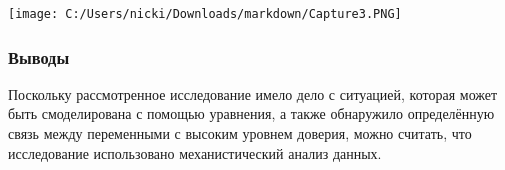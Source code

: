 \documentclass[
]{article}
\begin{document}
\texttt{[image: C:/Users/nicki/Downloads/markdown/Capture3.PNG]}

\hypertarget{ux432ux44bux432ux43eux434ux44b-1}{%
\subsubsection{Выводы}\label{ux432ux44bux432ux43eux434ux44b-1}}

Поскольку рассмотренное исследование имело дело с ситуацией, которая
может быть смоделирована с помощью уравнения, а также обнаружило
определённую связь между переменными с высоким уровнем доверия, можно
считать, что исследование использовано механистический анализ данных.
\end{document}
